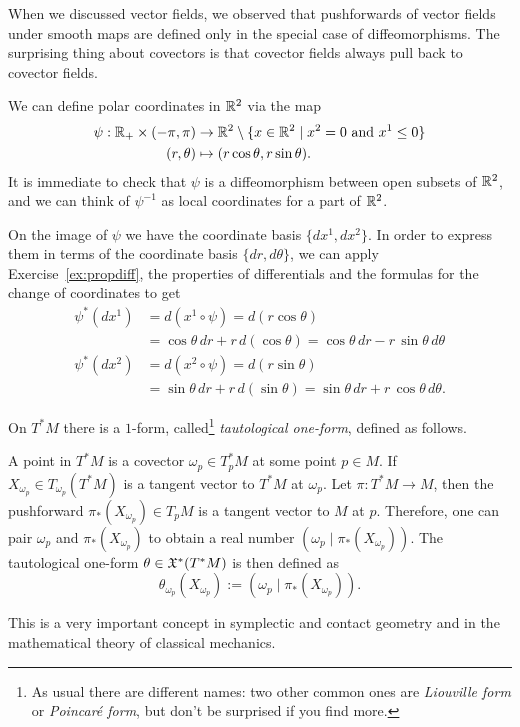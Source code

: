 When we discussed vector fields, we observed that pushforwards of vector fields under smooth maps are defined only in the special case of diffeomorphisms.
The surprising thing about covectors is that covector fields always pull back to covector fields.

\begin{example}
	We can define polar coordinates in $\mathbb{R}^2$ via the map
	\begin{align}
		\psi : \mathbb{R}_+\times (-\pi, \pi) & \to \mathbb{R}^2\setminus\{x\in\mathbb{R}^2\mid x^2=0 \mbox{ and } x^1 \leq 0\} \\
		(r, \theta)                   & \mapsto (r\cos\theta, r\sin\theta).
	\end{align}
	It is immediate to check that $\psi$ is a diffeomorphism between open subsets of $\mathbb{R}^2$, and we can think of $\psi^{-1}$ as local coordinates for a part of $\mathbb{R}^2$.

	On the image of $\psi$ we have the coordinate basis $\{dx^1, dx^2\}$. In order to express them in terms of the coordinate basis $\{dr,d\theta\}$, we can apply Exercise~\ref{ex:propdiff}, the properties of differentials and the formulas for the change of coordinates to get
	\begin{align}
		\psi^*(d x^1) & = d(x^1\circ \psi) = d(r\cos\theta)                                            \\
		              & = \cos\theta \,dr +r\,d(\cos\theta) = \cos\theta \,dr -r\,\sin\theta\,d\theta  \\
		\psi^*(d x^2) & = d(x^2\circ \psi) = d(r\sin\theta)                                            \\
		              & = \sin\theta \,dr +r\,d(\sin\theta) = \sin\theta \,dr +r\,\cos\theta\,d\theta.
	\end{align}
\end{example}

\begin{example}
	On $T^*M$ there is a $1$-form, called\footnote{As usual there are different names: two other common ones are \emph{Liouville form} or \emph{Poincar\'e form}, but don't be surprised if you find more.} \emph{tautological one-form}, defined as follows.

	A point in $T^*M$ is a covector $\omega_p\in T^*_p M$ at some point $p\in M$. If $X_{\omega_p}\in T_{\omega_p}(T^*M)$ is a tangent vector to $T^*M$ at $\omega_p$. Let $\pi:T^*M \to M$, then the pushforward $\pi_*(X_{\omega_p})\in T_p M$ is a tangent vector to $M$ at $p$.
	Therefore, one can pair $\omega_p$ and $\pi_*(X_{\omega_p})$ to obtain a real number $\left(\omega_p\;\big|\;\pi_*(X_{\omega_p})\right)$.
	The tautological one-form $\theta\in\mathfrak{X}^*(T^*M)$ is then defined as
	\begin{equation}
		\theta_{\omega_p}(X_{\omega_p}) := \left(\omega_p\;\Big|\;\pi_*(X_{\omega_p})\right).
	\end{equation}

	This is a very important concept in symplectic and contact geometry and in the mathematical theory of classical mechanics.
\end{example}

